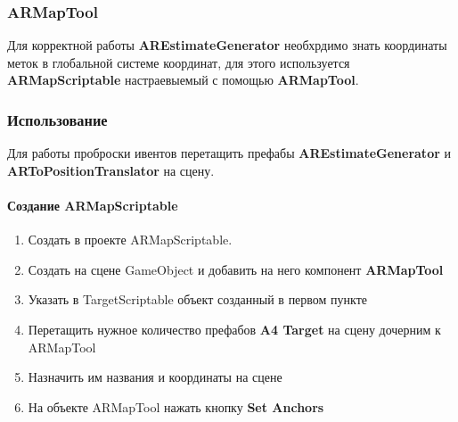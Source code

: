 \documentclass[a4paper, 11pt, titlepage]{article}
\begin{document}
      \subsubsection{ARMapTool}
        Для корректной работы \textbf{AREstimateGenerator} необхрдимо знать координаты меток в глобальной системе координат, для 
        этого используется \textbf{ARMapScriptable} настраевыемый с помощью \textbf{ARMapTool}.\\
        \begin{center}
        \end{center}  

      \subsubsection{Использование}
        Для работы проброски ивентов перетащить префабы \textbf{AREstimateGenerator} и \textbf{ARToPositionTranslator}
        на сцену.
        \paragraph{Создание ARMapScriptable}
          \begin{enumerate}
            \item Создать в проекте ARMapScriptable.
            \item Создать на сцене GameObject и добавить на него компонент \textbf{ARMapTool}
            \item Указать в TargetScriptable объект созданный в первом пункте
            \item Перетащить нужное количество префабов \textbf{A4 Target} на сцену дочерним к ARMapTool
            \item Назначить им названия и координаты на сцене
            \item На объекте ARMapTool нажать кнопку \textbf{Set Anchors}
          \end{enumerate}
\end{document}
